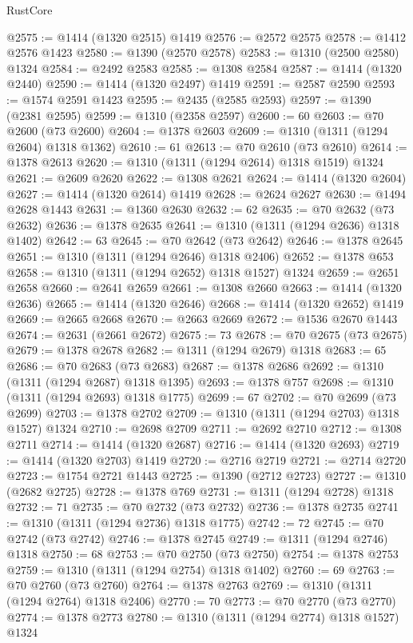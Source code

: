 \begin{lexlean}{RustCore}
\begin{coremodule}
@2575 := @1414 (@1320 @2515) @1419
@2576 := @2572 @2575
@2578 := @1412 @2576 @1423
@2580 := @1390 (@2570 @2578)
@2583 := @1310 (@2500 @2580) @1324
@2584 := @2492 @2583
@2585 := @1308 @2584
@2587 := @1414 (@1320 @2440)
@2590 := @1414 (@1320 @2497) @1419
@2591 := @2587 @2590
@2593 := @1574 @2591 @1423
@2595 := @2435 (@2585 @2593)
@2597 := @1390 (@2381 @2595)
@2599 := @1310 (@2358 @2597)
@2600 := 60
@2603 := @70 @2600 (@73 @2600)
@2604 := @1378 @2603
@2609 := @1310 (@1311 (@1294 @2604) @1318 @1362)
@2610 := 61
@2613 := @70 @2610 (@73 @2610)
@2614 := @1378 @2613
@2620 := @1310 (@1311 (@1294 @2614) @1318 @1519) @1324
@2621 := @2609 @2620
@2622 := @1308 @2621
@2624 := @1414 (@1320 @2604)
@2627 := @1414 (@1320 @2614) @1419
@2628 := @2624 @2627
@2630 := @1494 @2628 @1443
@2631 := @1360 @2630
@2632 := 62
@2635 := @70 @2632 (@73 @2632)
@2636 := @1378 @2635
@2641 := @1310 (@1311 (@1294 @2636) @1318 @1402)
@2642 := 63
@2645 := @70 @2642 (@73 @2642)
@2646 := @1378 @2645
@2651 := @1310 (@1311 (@1294 @2646) @1318 @2406)
@2652 := @1378 @653
@2658 := @1310 (@1311 (@1294 @2652) @1318 @1527) @1324
@2659 := @2651 @2658
@2660 := @2641 @2659
@2661 := @1308 @2660
@2663 := @1414 (@1320 @2636)
@2665 := @1414 (@1320 @2646)
@2668 := @1414 (@1320 @2652) @1419
@2669 := @2665 @2668
@2670 := @2663 @2669
@2672 := @1536 @2670 @1443
@2674 := @2631 (@2661 @2672)
@2675 := 73
@2678 := @70 @2675 (@73 @2675)
@2679 := @1378 @2678
@2682 := @1311 (@1294 @2679) @1318
@2683 := 65
@2686 := @70 @2683 (@73 @2683)
@2687 := @1378 @2686
@2692 := @1310 (@1311 (@1294 @2687) @1318 @1395)
@2693 := @1378 @757
@2698 := @1310 (@1311 (@1294 @2693) @1318 @1775)
@2699 := 67
@2702 := @70 @2699 (@73 @2699)
@2703 := @1378 @2702
@2709 := @1310 (@1311 (@1294 @2703) @1318 @1527) @1324
@2710 := @2698 @2709
@2711 := @2692 @2710
@2712 := @1308 @2711
@2714 := @1414 (@1320 @2687)
@2716 := @1414 (@1320 @2693)
@2719 := @1414 (@1320 @2703) @1419
@2720 := @2716 @2719
@2721 := @2714 @2720
@2723 := @1754 @2721 @1443
@2725 := @1390 (@2712 @2723)
@2727 := @1310 (@2682 @2725)
@2728 := @1378 @769
@2731 := @1311 (@1294 @2728) @1318
@2732 := 71
@2735 := @70 @2732 (@73 @2732)
@2736 := @1378 @2735
@2741 := @1310 (@1311 (@1294 @2736) @1318 @1775)
@2742 := 72
@2745 := @70 @2742 (@73 @2742)
@2746 := @1378 @2745
@2749 := @1311 (@1294 @2746) @1318
@2750 := 68
@2753 := @70 @2750 (@73 @2750)
@2754 := @1378 @2753
@2759 := @1310 (@1311 (@1294 @2754) @1318 @1402)
@2760 := 69
@2763 := @70 @2760 (@73 @2760)
@2764 := @1378 @2763
@2769 := @1310 (@1311 (@1294 @2764) @1318 @2406)
@2770 := 70
@2773 := @70 @2770 (@73 @2770)
@2774 := @1378 @2773
@2780 := @1310 (@1311 (@1294 @2774) @1318 @1527) @1324

\end{coremodule}
\end{lexlean}
